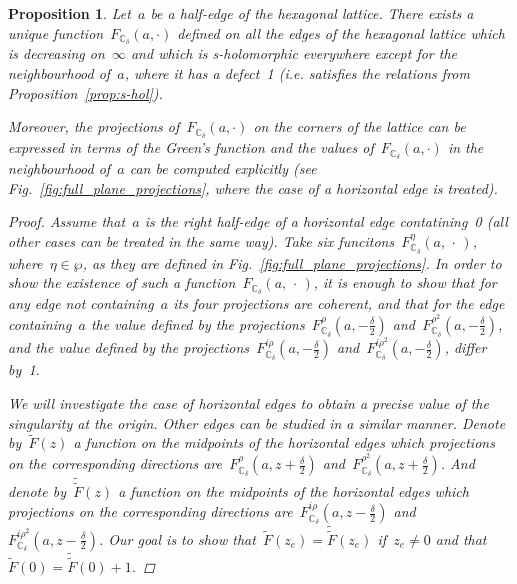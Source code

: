\documentclass[reqno,11pt,a4paper]{amsart}
\newtheorem{proposition}{Proposition}[section]
\theoremstyle{remark}
\newcommand{\C}{\mathbb{C}}
\begin{document}
\begin{proposition}
\label{prop:full-plane_existence}
Let~$a$ be a half-edge of the hexagonal lattice.
There exists a unique function~$F_{\C_\delta}(a,\cdot)$ defined on all the edges of the hexagonal lattice
which is decreasing on~$\infty$ and which is s-holomorphic everywhere except for the neighbourhood of~$a$,
where it has a defect~1 (i.e. satisfies the relations from Proposition~\ref{prop:s-hol}).

Moreover, the projections of~$F_{\C_\delta}(a,\cdot)$ on the corners of the lattice can be expressed
in terms of the Green's function and the values of~$F_{\C_\delta}(a,\cdot)$ in the neighbourhood of~$a$
can be computed explicitly (see Fig.~\ref{fig:full_plane_projections}, where the case of a horizontal edge is treated).

\begin{proof}
Assume that~$a$ is the right half-edge of a horizontal edge contatining~0 (all other cases can be treated in the same way).
Take six funcitons~$F_{\C_\delta}^\eta(a,\,\cdot\,)$, where~$\eta\in\wp$,
as they are defined in Fig.~\ref{fig:full_plane_projections}.
In order to show the existence of such a function~$F_{\C_\delta}(a,\,\cdot\,)$,
it is enough to show that for any edge not containing~$a$ its four projections are coherent,
and that for the edge containing~$a$
the value defined by the projections~$F_{\C_\delta}^\rho(a,-\tfrac{\delta}{2})$ and~$F_{\C_\delta}^{\rho^2}(a,-\tfrac{\delta}{2})$,
and the value defined by the projections~$F_{\C_\delta}^{i\rho}(a,-\tfrac{\delta}{2})$ and~$F_{\C_\delta}^{i\rho^2}(a,-\tfrac{\delta}{2})$,
differ by~1.

We will investigate the case of horizontal edges to obtain a precise value of the singularity
at the origin.
Other edges can be studied in a similar manner.
Denote by~$\tilde{F}(z)$ a function on the midpoints of the horizontal edges which projections on the corresponding directions
are~$F_{\C_\delta}^\rho(a,z+\tfrac{\delta}{2})$ and~$F_{\C_\delta}^{\rho^2}(a,z+\tfrac{\delta}{2})$.
And denote by~$\tilde{\tilde{F}}(z)$ a function on the midpoints of the horizontal edges which projections on the corresponding directions
are~$F_{\C_\delta}^{i\rho}(a,z-\tfrac{\delta}{2})$ and~$F_{\C_\delta}^{i\rho^2}(a,z-\tfrac{\delta}{2})$.
Our goal is to show that~$\tilde{F}(z_e) = \tilde{\tilde{F}}(z_e)$ if~$z_e \ne 0$
and that~$\tilde{F}(0) = \tilde{\tilde{F}}(0) + 1$.


\end{proof}
\end{proposition}
\end{document}
